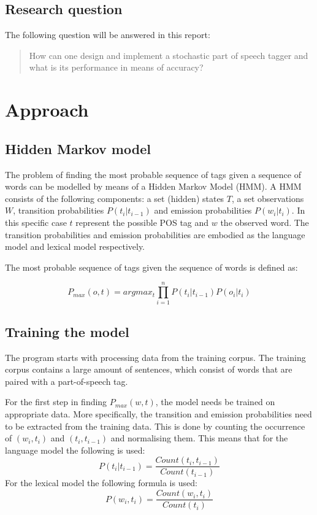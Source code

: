 \documentclass[titlepage,a4paper, 10pt]{article}
\begin{document}
\subsection{Research question}
The following question will be answered in this report:
\begin{quote}
How can one design and implement a stochastic part of speech tagger and what is its performance in means of accuracy?
\end{quote}

\section{Approach}

\subsection{Hidden Markov model}
The problem of finding the most probable sequence of tags given a sequence of words can be modelled by means of a Hidden Markov Model (HMM).
A HMM consists of the following components: a set (hidden) states $T$, a set observations $W$, transition probabilities $P(t_i|t_{i-1})$ and emission probabilities $P(w_i|t_i)$. 
In this specific case $t$ represent the possible POS tag and $w$ the observed word.
The transition probabilities and emission probabilities are embodied as the language model and lexical model respectively.

The most probable sequence of tags given the sequence of words is defined as:

$$ P_{max}(o,t) = argmax_t \prod_{i = 1}^{n} P(t_i|t_{i-1})P(o_i | t_i) $$
\subsection{Training the model}
The program starts with processing data from the training corpus. 
The training corpus contains a large amount of sentences, which consist of words that are paired with a part-of-speech tag.

For the first step in finding $P_{max}(w,t)$, the model needs be trained on appropriate data.
More specifically, the transition and emission probabilities need to be extracted from the training data.
This is done by counting the occurrence of $(w_i, t_i)$  and $(t_i, t_{i-1})$ and normalising them. This means that for the language model the following is used: 
$$ P(t_i|t_{i-1}) = \frac{Count(t_i, t_{i-1})}{Count(t_{i-1})} $$ 
For the lexical model the following formula is used:
$$ P(w_i, t_i) = \frac{Count(w_i, t_i)}{Count(t_i)}$$ 
\end{document}
